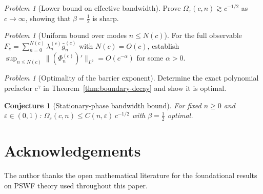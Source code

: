 \documentclass[12pt,a4paper]{amsart}
\newtheorem{conjecture}[theorem]{Conjecture}
\theoremstyle{remark}
\newtheorem{problem}[theorem]{Problem}
\begin{document}
\begin{problem}[Lower bound on effective bandwidth]
\label{prob:lower-bound}
Prove $\Omega_\varepsilon(c,n) \gtrsim c^{-1/2}$ as $c\to\infty$,
showing that $\beta = \tfrac{1}{2}$ is sharp.
\end{problem}

\begin{problem}[Uniform bound over modes $n \le N(c)$]
\label{prob:uniform-n}
For the full observable $F_c = \sum_{n=0}^{N(c)}\lambda_n^{(c)}\widehat{g}_n^{(c)}$
with $N(c) = O(c)$, establish
$\sup_{n \le N(c)} \|(\Phi_n^{(c)})'\|_{L^2} = O(c^{-\alpha})$
for some $\alpha > 0$.
\end{problem}

\begin{problem}[Optimality of the barrier exponent]
\label{prob:barrier-optimal}
Determine the exact polynomial prefactor $c^\gamma$ in
Theorem~\ref{thm:boundary-decay} and show it is optimal.
\end{problem}

\begin{conjecture}[Stationary-phase bandwidth bound]
\label{conj:sp-decay}
For fixed $n \ge 0$ and $\varepsilon \in (0,1)$:
$\Omega_\varepsilon(c,n) \le C(n,\varepsilon)\,c^{-1/2}$
with $\beta = \tfrac{1}{2}$ optimal.
\end{conjecture}

\section*{Acknowledgements}

The author thanks the open mathematical literature for the
foundational results on PSWF theory used throughout this paper.
\end{document}
